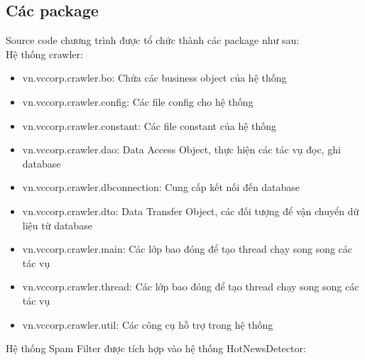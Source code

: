 	\subsection{Các package}
	Source code chương trình được tổ chức thành các package như sau:\\
	Hệ thống crawler:
	\begin{itemize}
		\item vn.vccorp.crawler.bo: Chứa các business object của hệ thống
		\item vn.vccorp.crawler.config: Các file config cho hệ thống
		\item vn.vccorp.crawler.constant: Các file constant của hệ thống
		\item vn.vccorp.crawler.dao: Data Access Object, thực hiện các tác vụ đọc, ghi database
		\item vn.vccorp.crawler.dbconnection: Cung cấp kết nối đến database
		\item vn.vccorp.crawler.dto: Data Transfer Object, các đối tượng để vận chuyển dữ liệu từ database
		\item vn.vccorp.crawler.main: Các lớp bao đóng để tạo thread chạy song song các tác vụ
		\item vn.vccorp.crawler.thread: Các lớp bao đóng để tạo thread chạy song song các tác vụ
		\item vn.vccorp.crawler.util: Các công cụ hỗ trợ trong hệ thống
		
	\end{itemize}
	Hệ thống Spam Filter được tích hợp vào hệ thống HotNewsDetector:
